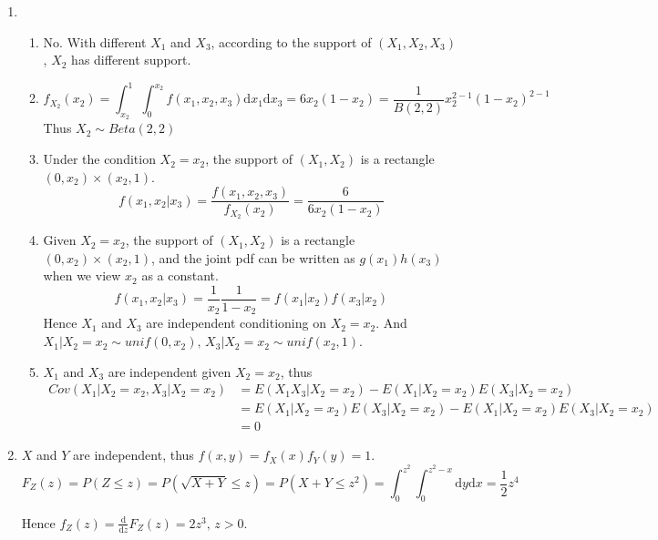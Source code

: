\documentclass{article}
\begin{document}
\begin{enumerate}[leftmargin = 0 em, label = \arabic*., font = \bfseries]
	 \item 
	 \begin{enumerate}
	 	\item 
	 	 No. With different $X_1$ and $X_3$, according to the support of $(X_1, X_2, X_3)$, $X_2$ has different support.

	 	 \item 
	 	 \[f_{X_2} (x_2) = \int_{x_2}^1 \int_{0}^{x_2} f(x_1, x_2, x_3) \mathrm{d}x_1 \mathrm{d}x_3 = 6 x_2 (1 - x_2) = \frac{1}{B(2,2)} x_2^{2 - 1} (1 - x_2)^{2-1}\]
	 	 Thus $X_2 \sim Beta(2,2)$

	 	 \item 
	 	 Under the condition $X_2 = x_2$, the support of $(X_1, X_2)$ is a rectangle $(0, x_2)\times (x_2 ,1)$.
	 	 \[f(x_1, x_2 |x_3) = \frac{f(x_1, x_2, x_3)}{f_{X_2}(x_2)} = \frac{6}{6x_2 (1 - x_2)} \]
	 	

	 	 \item 
	 	 Given $X_2 = x_2$, the support of $(X_1, X_2)$ is a rectangle $(0, x_2)\times (x_2 ,1)$, and the joint pdf can be written as $g(x_1)h(x_3)$ when we view $x_2$ as a constant.
	 	 \[f(x_1, x_2 |x_3) =\frac{1}{x_2} \frac{1}{1 - x_2} = f(x_1 | x_2) f(x_3 | x_2)\]
	 	 Hence $X_1$ and $X_3$ are independent conditioning on $X_2 = x_2$. And $X_1 | X_2 = x_2 \sim unif(0, x_2),\, X_3 | X_2 = x_2 \sim unif(x_2, 1)$.
	 	 \item 
	 	 $X_1$ and $X_3$ are independent given $X_2 = x_2$, thus 
	 	 \begin{align*}
	 	 Cov(X_1|X_2 = x_2, X_3|X_2 = x_2) &= E(X_1 X_3 | X_2 = x_2) - E(X_1|X_2 = x_2) E(X_3 | X_2 = x_2) \\
	 	 & = E(X_1 | X_2 = x_2) E(X_3 | X_2 = x_2) - E(X_1 | X_2 = x_2) E(X_3 | X_2 = x_2)\\
	 	 & = 0
	 	 \end{align*}
	 	 
	 	  

	 \end{enumerate}

	 \item 
	 $X$ and $Y$ are independent, thus $f(x,y) = f_X (x) f_{Y}(y) = 1$.
	 \[F_Z (z) = P(Z \leq z) = P(\sqrt{X+Y} \leq z) = P(X+Y \leq z^2) = \int_{0}^{z^2} \int_{0}^{z^2 - x} \mathrm{d}y \mathrm{d}x = \frac{1}{2} z^4\]

	 Hence $f_Z (z) = \frac{\mathrm{d}}{\mathrm{d}z} F_Z (z) = 2 z^3,\, z > 0$.
	 
	

	 
	 
	 
	 
	 
	 
	 
	 
	 
	  
	
	


 	\end{enumerate}


	
	
	
	
\end{document}
